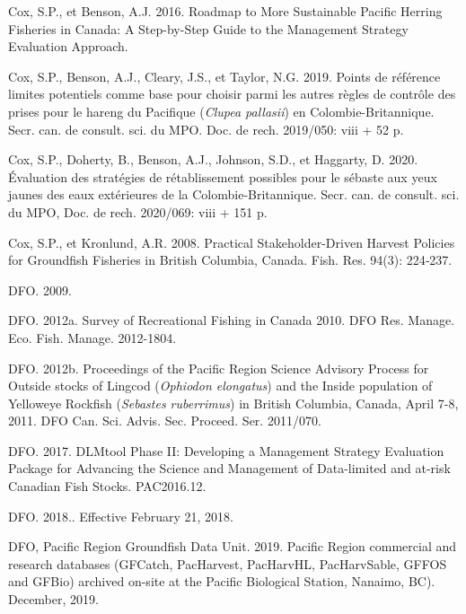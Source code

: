 \documentclass[french,11pt]{book}
\begin{document}
\leavevmode\hypertarget{ref-cox2016}{}%
Cox, S.P., et Benson, A.J. 2016. Roadmap to More Sustainable Pacific Herring Fisheries in Canada: A Step-by-Step Guide to the Management Strategy Evaluation Approach.

\leavevmode\hypertarget{ref-cox2019}{}%
Cox, S.P., Benson, A.J., Cleary, J.S., et Taylor, N.G. 2019. Points de référence limites potentiels comme base pour choisir parmi les autres règles de contrôle des prises pour le hareng du Pacifique (\emph{Clupea pallasii}) en Colombie-Britannique. Secr. can. de consult. sci. du MPO. Doc. de rech. 2019/050: viii + 52 p.

\leavevmode\hypertarget{ref-cox2020}{}%
Cox, S.P., Doherty, B., Benson, A.J., Johnson, S.D., et Haggarty, D. 2020. Évaluation des stratégies de rétablissement possibles pour le sébaste aux yeux jaunes des eaux extérieures de la Colombie-Britannique. Secr. can. de consult. sci. du MPO, Doc. de rech. 2020/069: viii + 151 p.

\leavevmode\hypertarget{ref-cox2008a}{}%
Cox, S.P., et Kronlund, A.R. 2008. Practical Stakeholder-Driven Harvest Policies for Groundfish Fisheries in British Columbia, Canada. Fish. Res. 94(3): 224‑237.

\leavevmode\hypertarget{ref-dfo2009}{}%
DFO. 2009.

\leavevmode\hypertarget{ref-dfo2012}{}%
DFO. 2012a. Survey of Recreational Fishing in Canada 2010. DFO Res. Manage. Eco. Fish. Manage. 2012-1804.

\leavevmode\hypertarget{ref-dfo2012b}{}%
DFO. 2012b. Proceedings of the Pacific Region Science Advisory Process for Outside stocks of Lingcod (\emph{Ophiodon elongatus}) and the Inside population of Yelloweye Rockfish (\emph{Sebastes ruberrimus}) in British Columbia, Canada, April 7-8, 2011. DFO Can. Sci. Advis. Sec. Proceed. Ser. 2011/070.

\leavevmode\hypertarget{ref-dfo_dlmtool_2017}{}%
DFO. 2017. DLMtool Phase II: Developing a Management Strategy Evaluation Package for Advancing the Science and Management of Data-limited and at-risk Canadian Fish Stocks. PAC2016.12.

\leavevmode\hypertarget{ref-ifmp2018}{}%
DFO. 2018.. Effective February 21, 2018.

\leavevmode\hypertarget{ref-databases2019}{}%
DFO, Pacific Region Groundfish Data Unit. 2019. Pacific Region commercial and research databases (GFCatch, PacHarvest, PacHarvHL, PacHarvSable, GFFOS and GFBio) archived on-site at the Pacific Biological Station, Nanaimo, BC). December, 2019.
\end{document}
